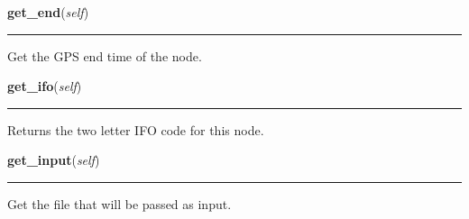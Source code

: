     \noindent\begin{boxedminipage}{\textwidth}

    \raggedright \textbf{get\_end}(\textit{self})

    \vspace{-1.5ex}

    \rule{\textwidth}{0.5\fboxrule}
    Get the GPS end time of the node.

    \vspace{1ex}

    \end{boxedminipage}

    \label{pipeline:AnalysisNode:get_ifo}
    \vspace{0.5ex}

    \noindent\begin{boxedminipage}{\textwidth}

    \raggedright \textbf{get\_ifo}(\textit{self})

    \vspace{-1.5ex}

    \rule{\textwidth}{0.5\fboxrule}
    Returns the two letter IFO code for this node.

    \vspace{1ex}

    \end{boxedminipage}

    \label{pipeline:AnalysisNode:get_input}
    \vspace{0.5ex}

    \noindent\begin{boxedminipage}{\textwidth}

    \raggedright \textbf{get\_input}(\textit{self})

    \vspace{-1.5ex}

    \rule{\textwidth}{0.5\fboxrule}
    Get the file that will be passed as input.

    \vspace{1ex}

    \end{boxedminipage}

    \label{pipeline:AnalysisNode:get_output}
    \vspace{0.5ex}

